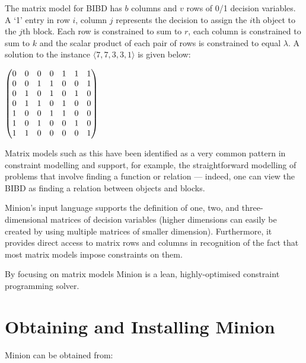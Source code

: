 \documentclass{article}
\begin{document}
The matrix model for BIBD has $b$ columns and $v$ rows of 0/1 decision
variables. A `1' entry in row $i$, column $j$ represents the decision
to assign the $i$th object to the $j$th block. Each row is constrained
to sum to $r$, each column is constrained to sum to $k$ and the scalar
product of each pair of rows is constrained to equal $\lambda$. A
solution to the instance $\langle 7, 7, 3, 3, 1\rangle$ is given
below:

$\begin{pmatrix}0&0&0&0&1&1&1\cr
         0&0&1&1&0&0&1\cr
         0&1&0&1&0&1&0\cr
         0&1&1&0&1&0&0\cr
         1&0&0&1&1&0&0\cr
         1&0&1&0&0&1&0\cr
         1&1&0&0&0&0&1\end{pmatrix}$

Matrix models such as this have been identified as a very common
pattern in constraint modelling and support, for example, the
straightforward modelling of problems that involve finding a function
or relation --- indeed, one can view the BIBD as finding a relation
between objects and blocks.

{\sc Minion}'s input language supports the definition of one, two, and
three-dimensional matrices of decision variables (higher dimensions
can easily be created by using multiple matrices of smaller
dimension).  Furthermore, it provides direct access to matrix rows and
columns in recognition of the fact that most matrix models impose
constraints on them.

By focusing on matrix models {\sc Minion} is a lean, highly-optimised
constraint programming solver.

\section{Obtaining and Installing {\sc Minion}}

{\sc Minion} can be obtained from:
\end{document}
